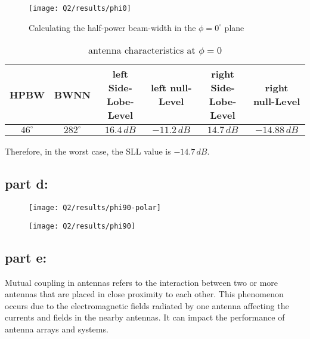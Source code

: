 \documentclass[12pt,onecolumn,a4paper]{article}
\begin{document}
	
	\begin{figure}[h]
		\centering
		\texttt{[image: Q2/results/phi0]}
		\caption{Calculating the half-power beam-width in the $\phi = 0^\circ$ plane}
		\label{fig:phi0}
	\end{figure}
	
	
	\begin{table}[H]
		\centering
		\caption{antenna characteristics at $\phi = 0$}
		{\scriptsize
		\begin{tabular}{cccccc}
			\toprule
			\textbf{HPBW} & \textbf{BWNN} & \textbf{left Side-Lobe-Level} &  \textbf{left null-Level} & \textbf{right Side-Lobe-Level} & \textbf{right null-Level} \\
			\midrule
			$46^\circ$ & $282^\circ$ & $16.4\, dB$ & $-11.2\, dB$ & $14.7\, dB$ & $-14.88\, dB$
			\\
			\bottomrule
		\end{tabular}}
	\end{table}
	
	Therefore, in the worst case, the SLL value is $-14.7\, dB$.
	
	
	
	\FloatBarrier
	\subsection{part d:}
	
	
	
	\begin{figure}[h]
		\centering
		\texttt{[image: Q2/results/phi90-polar]}
		\caption{}
		\label{fig:phi90-polar}
	\end{figure}
	
	
	\begin{figure}[h]
		\centering
		\texttt{[image: Q2/results/phi90]}
		\caption{}
		\label{fig:phi90}
	\end{figure}
	
	
	
	\FloatBarrier
	\subsection{part e:}
	
	
	Mutual coupling in antennas refers to the interaction between two or more antennas that are placed in close proximity to each other. This phenomenon occurs due to the electromagnetic fields radiated by one antenna affecting the currents and fields in the nearby antennas. It can impact the performance of antenna arrays and systems.
	
\end{document}
